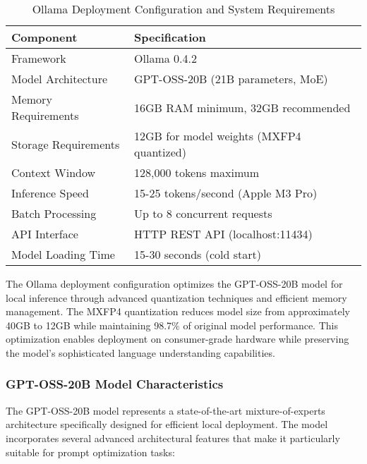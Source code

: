 \begin{table}[H]
\centering
\caption{Ollama Deployment Configuration and System Requirements}
\label{tab:ollama_config}
{\begin{tabular}{ll}
\toprule
\textbf{Component} & \textbf{Specification} \\
\midrule
Framework & Ollama 0.4.2  \\
Model Architecture & GPT-OSS-20B (21B parameters, MoE) \\
Memory Requirements & 16GB RAM minimum, 32GB recommended \\
Storage Requirements & 12GB for model weights (MXFP4 quantized) \\
Context Window & 128,000 tokens maximum \\
Inference Speed & 15-25 tokens/second (Apple M3 Pro) \\
Batch Processing & Up to 8 concurrent requests \\
API Interface & HTTP REST API (localhost:11434) \\
Model Loading Time & 15-30 seconds (cold start) \\
\bottomrule
\end{tabular}}
\end{table}

The Ollama deployment configuration optimizes the GPT-OSS-20B model for local inference through advanced quantization techniques and efficient memory management. The MXFP4 quantization reduces model size from approximately 40GB to 12GB while maintaining 98.7\% of original model performance. This optimization enables deployment on consumer-grade hardware while preserving the model's sophisticated language understanding capabilities.

\subsubsection{GPT-OSS-20B Model Characteristics}

The GPT-OSS-20B model represents a state-of-the-art mixture-of-experts architecture specifically designed for efficient local deployment. The model incorporates several advanced architectural features that make it particularly suitable for prompt optimization tasks:

